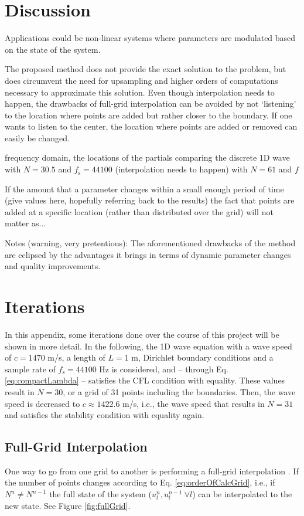 \documentclass[dvipsnames, reprint]{JASA}
\def\SWcomment[#1]{\textcolor{Bittersweet}{#1}}
\begin{document}
\section{Discussion}
Applications could be non-linear systems where parameters are modulated based on the state of the system. 

The proposed method does not provide the exact solution to the problem, but does circumvent the need for upsampling and higher orders of computations necessary to approximate this solution. Even though interpolation needs to happen, the drawbacks of full-grid interpolation can be avoided by not `listening' to the location where points are added but rather closer to the boundary. If one wants to listen to the center, the location where points are added or removed can easily be changed.


 frequency domain, the locations of the partials comparing the discrete 1D wave with $N = 30.5$ and $f_\text{s} = 44100$ (interpolation needs to happen) with $N = 61$ and $f$ 

If the amount that a parameter changes within a small enough period of time (give values here, hopefully referring back to the results) the fact that points are added at a specific location (rather than distributed over the grid) will not matter as... 



\SWcomment[Notes (warning, very pretentious):] The aforementioned drawbacks of the method are eclipsed by the advantages it brings in terms of dynamic parameter changes and quality improvements. 

\appendix
\section{Iterations}\label{app:A}
In this appendix, some iterations done over the course of this project will be shown in more detail. In the following, the 1D wave equation with a wave speed of $c = 1470$ m/s, a length of $L = 1$ m, Dirichlet boundary conditions and a sample rate of $f_\text{s} = 44100$ Hz is considered, and -- through Eq. \eqref{eq:compactLambda} -- satisfies the CFL condition with equality. These values result in $N = 30$, or a grid of 31 points including the boundaries. Then, the wave speed is decreased to $c \approx 1422.6$ m/s, i.e., the wave speed that results in $N=31$ and satisfies the stability condition with equality again. 

\subsection{Full-Grid Interpolation}
One way to go from one grid to another is performing a full-grid interpolation \cite[Chap. 5]{bilbao2009}. If the number of points changes according to Eq. \eqref{eq:orderOfCalcGrid}, i.e., if $N^n \neq N^{n-1}$ the full state of the system ($u_l^n, u_l^{n-1}\ \forall l$)  can be interpolated to the new state. See Figure \ref{fig:fullGrid}. 
\end{document}
